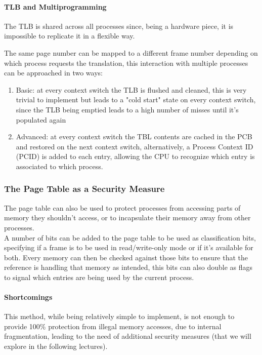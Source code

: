\documentclass[openright, twoside]{report}
\theoremstyle{definition}
\theoremstyle{example}
\begin{document}
\paragraph{TLB and Multiprogramming}
The TLB is shared across all processes since, being a hardware piece, it is 
impossible to replicate it in a flexible way.

The same page number can be mapped to a different frame number depending on which 
process requests the translation, this interaction with multiple processes can be 
approached in two ways:

\begin{enumerate}
	\item Basic: at every context switch the TLB is flushed and cleaned, this is very 
	trivial to implement but leads to a "cold start" state on every context switch, since 
	the TLB being emptied leads to a high number of misses until it's populated again
	\item Advanced: at every context switch the TBL contents are cached in the PCB and restored 
	on the next context switch, alternatively, a Process Context ID (PCID) is added to each entry,
	allowing the CPU to recognize which entry is associated to which process.
\end{enumerate}

\subsubsection{The Page Table as a Security Measure}
The page table can also be used to protect processes from accessing 
parts of memory they shouldn't access, or to incapsulate their memory away 
from other processes.\\ 

A number of bits can be added to the page table to be used as classification bits, 
specifying if a frame is to be used in read/write-only mode or if it's available for both.
Every memory can then be checked against those bits to ensure that the reference is handling 
that memory as intended, this bits can also double as flags to signal which entries are being used 
by the current process.

\paragraph{Shortcomings}
This method, while being relatively simple to implement, is not enough to provide 100\% protection from 
illegal memory accesses, due to internal fragmentation, leading to the need of additional 
security measures (that we will explore in the following lectures).
\end{document}
